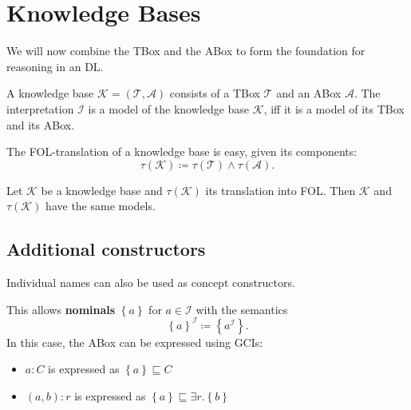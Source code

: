 \newpage
\section{Knowledge Bases}
We will now combine the TBox and the ABox to form the foundation for reasoning in an DL.
\begin{definition}
	A knowledge base $\mathcal{K} = (\mathcal{T}, \mathcal{A})$ consists of a TBox $\mathcal{T}$ and an ABox $\mathcal{A}$.
	The interpretation $\mathcal{I}$ is a model of the knowledge base $\mathcal{K}$, iff it is a model of its TBox and its ABox.
\end{definition}
The FOL-translation of a knowledge base is easy, given its components:
\[
\tau(\mathcal{K}) \coloneqq \tau(\mathcal{T}) \land \tau(\mathcal{A})
.\] 
\begin{lemma}
	Let $\mathcal{K}$ be a knowledge base and $\tau(\mathcal{K})$ its translation into FOL.
	Then $\mathcal{K}$ and $\tau(\mathcal{K})$ have the same models.
\end{lemma}

\subsection{Additional constructors}
Individual names can also be used as concept constructors.
\begin{example}
	This allows \textbf{nominals} $\left\{ a \right\} $ for $a \in \mathscr{I}$ with the semantics
	\[
	\left\{ a \right\} ^{\mathcal{I}} \coloneqq \left\{ a^{\mathcal{I}} \right\} 
	.\] 
	In this case, the ABox can be expressed using GCIs:
	\begin{itemize}
		\item $a:C$ is expressed as $\left\{ a \right\} \sqsubseteq C$
		\item $(a,b):r$ is expressed as $\left\{ a \right\} \sqsubseteq \exists r.\left\{ b \right\} $
	\end{itemize}
\end{example}

\newpage
